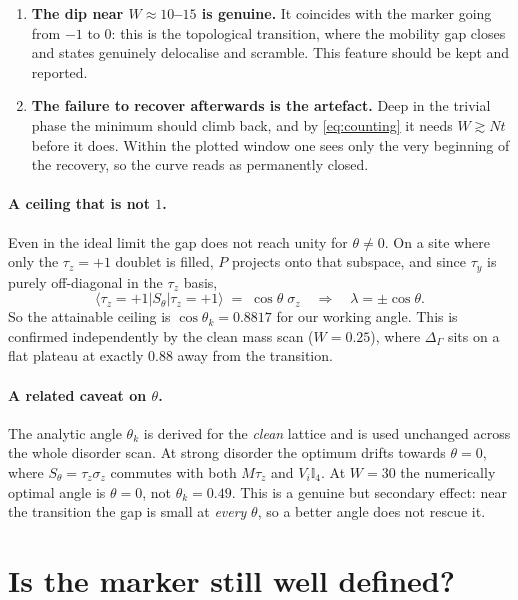 \documentclass[11pt,a4paper]{article}
\newcommand{\Sth}{S_\theta}
\begin{document}
\begin{enumerate}
  \item \textbf{The dip near $W\approx10$--$15$ is genuine.} It coincides with
        the marker going from $-1$ to $0$: this is the topological transition,
        where the mobility gap closes and states genuinely delocalise and
        scramble. This feature should be kept and reported.
  \item \textbf{The failure to recover afterwards is the artefact.} Deep in
        the trivial phase the minimum should climb back, and by
        \eqref{eq:counting} it needs $W \gtrsim Nt$ before it does. Within the
        plotted window one sees only the very beginning of the recovery, so
        the curve reads as permanently closed.
\end{enumerate}

\paragraph{A ceiling that is not $1$.} Even in the ideal limit the gap does not
reach unity for $\theta \neq 0$. On a site where only the $\tau_z=+1$ doublet
is filled, $P$ projects onto that subspace, and since $\tau_y$ is purely
off-diagonal in the $\tau_z$ basis,
\begin{equation}
  \langle \tau_z=+1 | \Sth | \tau_z = +1\rangle \;=\; \cos\theta\;\sigma_z
  \quad\Longrightarrow\quad
  \lambda = \pm\cos\theta .
\end{equation}
So the attainable ceiling is $\cos\theta_k = 0.8817$ for our working angle.
This is confirmed independently by the clean mass scan ($W=0.25$), where
$\Delta_\Gamma$ sits on a flat plateau at exactly $0.88$ away from the
transition.

\paragraph{A related caveat on $\theta$.} The analytic angle $\theta_k$ is
derived for the \emph{clean} lattice and is used unchanged across the whole
disorder scan. At strong disorder the optimum drifts towards $\theta=0$, where
$\Sth = \tau_z\sigma_z$ commutes with both $M\tau_z$ and $V_i\mathbb{I}_4$. At
$W=30$ the numerically optimal angle is $\theta=0$, not $\theta_k=0.49$. This
is a genuine but secondary effect: near the transition the gap is small at
\emph{every} $\theta$, so a better angle does not rescue it.

\section{Is the marker still well defined?}
\end{document}
